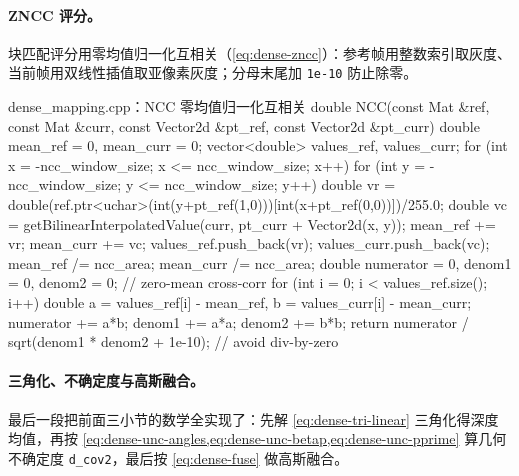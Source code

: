 \paragraph{ZNCC 评分。}
块匹配评分用零均值归一化互相关（\cref{eq:dense-zncc}）：参考帧用整数索引取灰度、当前帧用双线性插值取亚像素灰度；分母末尾加 \texttt{1e-10} 防止除零。

\begin{codebox}[C++]{dense\_mapping.cpp：NCC 零均值归一化互相关}
double NCC(const Mat &ref, const Mat &curr,
           const Vector2d &pt_ref, const Vector2d &pt_curr) {
  double mean_ref = 0, mean_curr = 0;
  vector<double> values_ref, values_curr;
  for (int x = -ncc_window_size; x <= ncc_window_size; x++)
  for (int y = -ncc_window_size; y <= ncc_window_size; y++) {
    double vr = double(ref.ptr<uchar>(int(y+pt_ref(1,0)))[int(x+pt_ref(0,0))])/255.0;
    double vc = getBilinearInterpolatedValue(curr, pt_curr + Vector2d(x, y));
    mean_ref += vr; mean_curr += vc;
    values_ref.push_back(vr); values_curr.push_back(vc);
  }
  mean_ref /= ncc_area; mean_curr /= ncc_area;
  double numerator = 0, denom1 = 0, denom2 = 0;     // zero-mean cross-corr
  for (int i = 0; i < values_ref.size(); i++) {
    double a = values_ref[i] - mean_ref, b = values_curr[i] - mean_curr;
    numerator += a*b; denom1 += a*a; denom2 += b*b;
  }
  return numerator / sqrt(denom1 * denom2 + 1e-10); // avoid div-by-zero
}
\end{codebox}

\paragraph{三角化、不确定度与高斯融合。}
最后一段把前面三小节的数学全实现了：先解 \cref{eq:dense-tri-linear} 三角化得深度均值，再按 \cref{eq:dense-unc-angles,eq:dense-unc-betap,eq:dense-unc-pprime} 算几何不确定度 \texttt{d\_cov2}，最后按 \cref{eq:dense-fuse} 做高斯融合。

